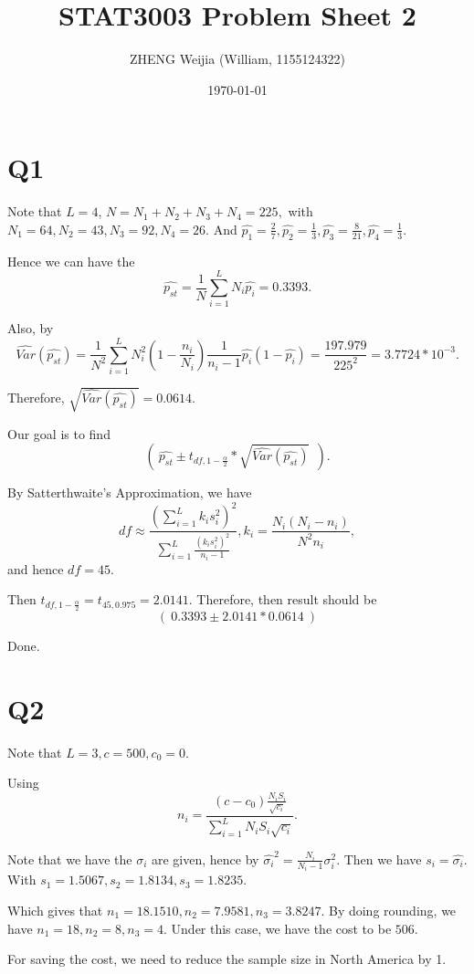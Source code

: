 \documentclass[12pt]{article}%
\begin{document}
\title{STAT3003 Problem Sheet 2}
\author{ZHENG Weijia (William, 1155124322)}
\date{\today}
\maketitle



\section{Q1}

Note that $L=4$, $N=N_1+N_2+N_3+N_4 = 225,$ with $N_1=64, N_2=43, N_3 = 92, N_4=26.$ And $\hat{p_1}=\frac{2}{7}, \hat{p_2}=\frac{1}{3}, \hat{p_3}=\frac{8}{21}, \hat{p_4}=\frac{1}{3}.$

Hence we can have the $$\hat{p_{st}}=\frac{1}{N}\sum_{i=1}^{L}N_i \hat{p_i}=0.3393.$$

Also, by $$\hat{Var}(\hat{p_{st}})=\frac{1}{N^2}\sum_{i=1}^{L}N_i^2(1-\frac{n_i}{N_i})\frac{1}{n_i-1}\hat{p_i}(1-\hat{p_i})=\frac{197.979}{225^2}=3.7724*10^{-3}.$$

Therefore, $\sqrt{\hat{Var}(\hat{p_{st}})}=0.0614.$

Our goal is to find $$(~\hat{p_{st}} \pm t_{df,1-\frac{\alpha}{2}}*\sqrt{\hat{Var}(\hat{p_{st}})}~~).$$

By Satterthwaite's Approximation, we have $$df \approx \frac{(\sum_{i=1}^{L}k_i s_{i}^2)^2}{\sum_{i=1}^{L}\frac{(k_i s_i^2)^2}{n_i-1}}, k_i=\frac{N_i(N_i-n_i)}{N^2n_i},$$ and hence $df=45.$

Then $t_{df,1-\frac{\alpha}{2}}=t_{45,0.975}=2.0141.$ Therefore, then result should be $$(~0.3393\pm 2.0141*0.0614~)$$

Done.

\section{Q2}
Note that $L=3, c = 500, c_0 =0.$

Using $$n_i=\frac{(c-c_0)\frac{N_i S_i}{\sqrt{c_i}}}{\sum_{i=1}^{L}N_i S_i \sqrt{c_i}}.$$ 

Note that we have the $\sigma_i$ are given, hence by $\hat{\sigma_i}^2=\frac{N_i}{N_i-1}\sigma_i^2.$ Then we have $s_i = \hat{\sigma_i}.$ With $s_1=1.5067, s_2 = 1.8134, s_3=1.8235.$

Which gives that $n_1=18.1510, n_2=7.9581, n_3=3.8247.$ By doing rounding, we have $n_1=18, n_2=8, n_3=4.$ Under this case, we have the cost to be $506.$

For saving the cost, we need to reduce the sample size in North America by 1. 
\end{document}
